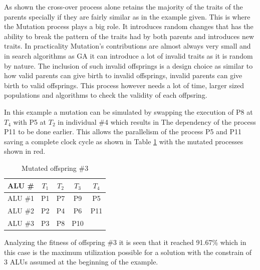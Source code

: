 \documentclass[conference]{IEEEtran}
\begin{document}
As shown the cross-over process alone retains the majority of the traits of the parents specially if they are fairly similar as in the example given. This is where the Mutation process plays a big role. It introduces random changes that has the ability to break the pattern of the traits had by both parents and introduces new traits. In practicality Mutation's contributions are almost always very small and in search algorithms as GA it can introduce a lot of invalid traits as it is random by nature. The inclusion of such invalid offsprings is a design choice as similar to how valid parents can give birth to invalid offsprings, invalid parents can give birth to valid offsprings. This process however needs a lot of time, larger sized populations and algorithms to check the validity of each offpsring.

In this example a mutation can be simulated by swapping the execution of P8 at $T_4$ with P5 at $T_2$ in individual \#4 which results in The dependency of the process P11 to be done earlier. This allows the parallelism  of the process P5 and P11 saving a complete clock cycle as shown in Table \ref{tab:mutated} with the mutated processes shown in red.
\begin{table}[h!]
    \centering
    \begin{tabular}{|c|c|c|c|c|}
        \hline
    ALU \#  & $T_1$ & $T_2$ &  $T_3$& $T_4$ \\
    \hline
       ALU \#1  &\cellcolor[HTML]{51C004} P1 &\cellcolor[HTML]{51C004} P7 & \cellcolor[HTML]{0079EA} P9& \cellcolor[HTML]{E60000}P5 \\
       \hline
       ALU \#2  &  \cellcolor[HTML]{51C004}P2 &\cellcolor[HTML]{0079EA}  P4 & \cellcolor[HTML]{51C004}P6 & P11 \\
       \hline
       ALU \#3  &\cellcolor[HTML]{0079EA} P3 & \cellcolor[HTML]{E60000}P8  & \cellcolor[HTML]{51C004}P10 &  \\
       \hline
    \end{tabular}
           \vspace{2pt}
    \caption{Mutated offspring \#3}
    \label{tab:mutated}
    \end{table}

Analyzing the fitness of offspring \#3 it is seen that it reached 91.67\% which in this case is the maximum utilization possible for a solution with the constrain of 3 ALUs assumed at the beginning of the example.
\end{document}
